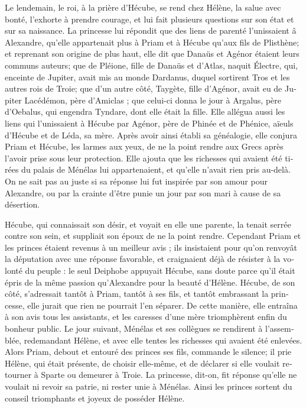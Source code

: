 \documentclass{article}
\begin{document}
\begin{pages}
\begin{Leftside}
\begin{french}
Le lendemain, le roi, à la prière d'Hécube, se rend chez Hélène, la salue avec bonté, l'exhorte à prendre courage, et lui fait plusieurs questions sur son état et sur sa naissance. La princesse lui répondit que des liens de parenté l'unissaient â Alexandre, qu'elle appartenait plus à Priam et à Hécube qu'aux fils de Plisthène; et reprenant son origine de plus haut, elle dit que Danaüs et Agénor étaient leurs communs auteurs; que de Pléione, fille de Danaüs et d'Atlas, naquit Électre, qui, enceinte de Jupiter, avait mis au monde Dardanus, duquel sortirent Tros et les autres rois de Troie; que d'un autre côté, Taygète, fille d'Agénor, avait eu de Jupiter Lacédémon, père d'Amiclas ; que celui-ci donna le jour à Argalus, père d'Oebalus, qui engendra Tyndare, dont elle était la fille. Elle allégua aussi les liens qui l'unissaient à Hécube par Agénor, père de Phinée et de Phénice, aïeuls d'Hécube et de Léda, sa mère. Après avoir ainsi établi sa généalogie, elle conjura Priam et Hécube, les larmes aux yeux, de ne la point rendre aux Grecs après l'avoir prise sous leur protection. Elle ajouta que les richesses qui avaient été tirées du palais de Ménélas lui appartenaient, et qu'elle n'avait rien pris au-delà. On ne sait pas au juste si sa réponse lui fut inspirée par son amour pour Alexandre, ou par la crainte d'être punie un jour par son mari à cause de sa désertion.

Hécube, qui connaissait son désir, et voyait en elle une parente, la tenait serrée contre son sein, et suppliait son époux de ne la point rendre. Cependant Priam et les princes étaient revenus à un meilleur avis ; ils insistaient pour qu'on renvoyât la députation avec une réponse favorable, et craignaient déjà de résister à la volonté du peuple : le seul Deiphobe appuyait Hécube, sans doute parce qu'il était épris de la même passion qu'Alexandre pour la beauté d'Hélène. Hécube, de son côté, s'adressait tantôt à Priam, tantôt à ses fils, et tantôt embrassant la princesse, elle jurait que rien ne pourrait l'en séparer. De cette manière, elle entraîna à son avis tous les assistants, et les caresses d'une mère triomphèrent enfin du bonheur public. Le jour suivant, Ménélas et ses collègues se rendirent à l'assemblée, redemandant Hélène, et avec elle tentes les richesses qui avaient été enlevées. Alors Priam, debout et entouré des princes ses fils, commande le silence; il prie Hélène, qui était présente, de choisir elle-même, et de déclarer si elle voulait retourner à Sparte ou demeurer à Troie. La princesse, dit-on, fit réponse qu'elle ne voulait ni revoir sa patrie, ni rester unie à Ménélas. Ainsi les princes sortent du conseil triomphants et joyeux de posséder Hélène.


\end{french}
\end{Leftside}
\end{pages}
\end{document}
